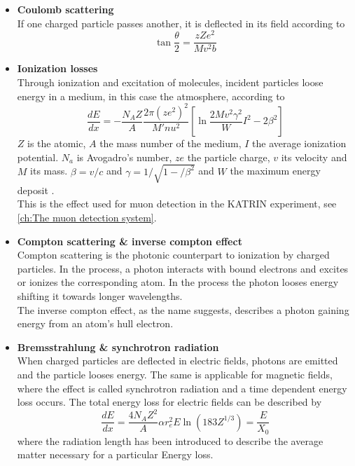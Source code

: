 \begin{itemize}
	
	\begin{itemize}
		\item {\bf Coulomb scattering}\\
		If one charged particle passes another, it is deflected in its field according to
		\begin{equation}
			\tan{\frac{\theta}{2}} = \frac{zZe^2}{Mv^2b}
		\end{equation}
		\item{\bf Ionization losses}\\
		Through ionization and excitation of molecules, incident particles loose energy in a medium, in this case the atmosphere, according to
		\begin{equation}
			\frac{dE}{dx} = -\frac{N_AZ}{A}\frac{2\pi\left(ze^2\right)^2}{M'nu^2}\left[\ln{\frac{2Mv^2\gamma^2}W{I^2}}-2\beta^2\right]
		\end{equation}
		$Z$ is the atomic, $A$ the mass number of the medium, $I$ the average ionization potential. $N_a$ is Avogadro's number, $ze$ the particle charge, $v$ its velocity and $M$ its mass. $\beta = v/c$ and $\gamma = 1/\sqrt{1-/\beta^2}$ and $W$ the maximum energy deposit \cite{Hayakawa}.\\
		This is the effect used for muon detection in the KATRIN experiment, see \ref{ch:The muon detection system}.
		
		\item{\bf Compton scattering \& inverse compton effect}\\
		Compton scattering is the photonic counterpart to ionization by charged particles. In the process, a photon interacts with bound electrons and excites or ionizes the corresponding atom. In the process the photon looses energy shifting it towards longer wavelengths.\\
		The inverse compton effect, as the name suggests, describes a photon gaining energy from an atom's hull electron.
		
		\item{\bf Bremsstrahlung \& synchrotron radiation}\\
		When charged particles are deflected in electric fields, photons are emitted and the particle looses energy. The same is applicable for magnetic fields, where the effect is called synchrotron radiation and a time dependent energy loss occurs. The total energy loss for electric fields can be described by
		\begin{equation}
			\frac{dE}{dx} = \frac{4N_AZ^2}{A}\alpha r_e^2 E  \ln{\left(183 Z^{1/3}\right)} = \frac{E}{X_0}
		\end{equation}
		where the radiation length has been introduced to describe the average matter necessary for a particular Energy loss.
		

\end{itemize}
\end{itemize}
